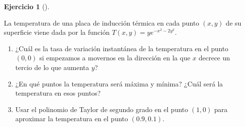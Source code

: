 \documentclass[
  spanish,
  a4paper,
]{scrreport}
\theoremstyle{definition}
\newtheorem{exercise}{Ejercicio}[chapter]
\theoremstyle{remark}
\begin{document}
\begin{exercise}[]\protect\hypertarget{exr-1}{}\label{exr-1}

La temperatura de una placa de inducción térmica en cada punto \((x,y)\)
de su superficie viene dada por la función \(T(x,y) = ye^{-x^2-2y^2}\).

\begin{enumerate}
\def\labelenumi{\alph{enumi}.}
\item
  ¿Cuál es la tasa de variación instantánea de la temperatura en el
  punto \((0,0)\) si empezamos a movernos en la dirección en la que
  \(x\) decrece un tercio de lo que aumenta \(y\)?
\item
  ¿En qué puntos la temperatura será máxima y mínima? ¿Cuál será la
  temperatura en esos puntos?
\item
  Usar el polinomio de Taylor de segundo grado en el punto \((1,0)\)
  para aproximar la temperatura en el punto \((0.9,0.1)\).
\end{enumerate}

\end{exercise}
\end{document}

